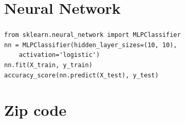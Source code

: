\section{Neural Network}



\begin{frame}[fragile]\frametitle{}
\tiny	
\begin{lstlisting}
from sklearn.neural_network import MLPClassifier
nn = MLPClassifier(hidden_layer_sizes=(10, 10), 
	activation='logistic')
nn.fit(X_train, y_train)
accuracy_score(nn.predict(X_test), y_test)
\end{lstlisting} 
\end{frame}


\section{Zip code}




